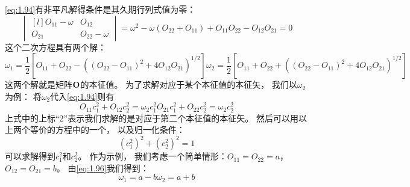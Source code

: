 \autoref{eq:1.94}有非平凡解得条件是其久期行列式值为零：
\begin{equation}
 \begin{vmatrix*}[l]
     O_{11}-\omega &O_{12} \\ O_{21} & O_{22}-\omega
 \end{vmatrix*} = \omega^2 - \omega\left(O_{22} + O_{11}\right) + O_{11}O_{22} - O_{12}O_{21} = 0
 \label{eq:1.95}
\end{equation}
这个二次方程具有两个解：
\begin{subequations}
 \begin{equation}
     \omega_1 = \frac{1}{2}\left[
     O_{11} + O_{22} - \left(\left(O_{22}-O_{11}\right)^2+4O_{12}O_{21}\right)^{1/2}
     \right]
     \label{eq:1.96a}
 \end{equation}
 \begin{equation}
     \omega_2 = \frac{1}{2}\left[
     O_{11} + O_{22} + \left(\left(O_{22}-O_{11}\right)^2+4O_{12}O_{21}\right)^{1/2}
     \right]
     \label{eq:1.96b}
 \end{equation}
 \label{eq:1.96}
\end{subequations}
这两个解就是矩阵$\mathbf O$的本征值。
为了求解对应于某个本征值的本征矢，
我们以$\omega_2$为例：
将$\omega_2$代入\autoref{eq:1.94}则有
\begin{subequations}
 \begin{equation}
     O_{11}c_1^2 + O_{12}c_2^2 = \omega_2 c_1^2
     \label{eq:1.97a}
 \end{equation}
 \begin{equation}
     O_{21}c_1^2 + O_{22}c_2^2 = \omega_2 c_2^2
     \label{eq:1.97b}
 \end{equation}
 \label{eq:1.97}
\end{subequations}
上式中的上标``2''表示我们求解的是对应于第二个本征值的本征矢。
然后可以用以上两个等价的方程中的一个，
以及归一化条件：
\begin{equation}
 \left(c_1^2\right)^2 + \left(c_2^2\right)^2 = 1
 \label{eq:1.98}
\end{equation}
可以求解得到$c_1^2$和$c_2^2$。
作为示例，
我们考虑一个简单情形：$O_{11} = O_{22} = a$，$O_{12} = O_{21} = b$。
由\autoref{eq:1.96}我们得到：
\begin{subequations}
 \begin{equation}
     \omega_1 = a - b
     \label{eq:1.99a}
 \end{equation}
 \begin{equation}
     \omega_2 = a + b
     \label{eq:1.99b}
 \end{equation}
 \label{eq:1.99}
\end{subequations}
